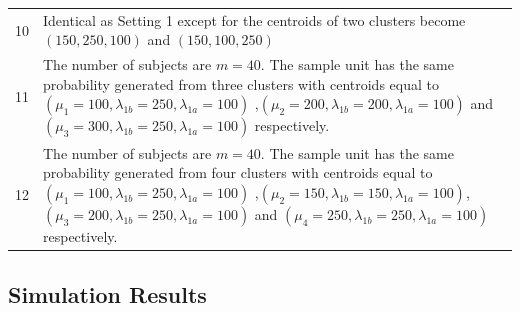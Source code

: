 \documentclass[12pt]{article}
\begin{document}
\begin{table}[htp]
\begin{tabular}{cl}
10& \multicolumn{1}{p{14.5cm}}{Identical as Setting 1  except for the centroids of two clusters become $(150,250,100)$ and $(150,100,250)$}\\
   
11& \multicolumn{1}{p{14.5cm}}{The number of subjects are $m=40$. The sample unit has the same probability generated from three clusters with centroids equal to $(\mu_1=100,\lambda_{1b}=250,\lambda_{1a}=100)$ ,$(\mu_2=200,\lambda_{1b}=200,\lambda_{1a}=100)$ and $(\mu_3=300,\lambda_{1b}=250,\lambda_{1a}=100)$ respectively.}\\

12& \multicolumn{1}{p{14.5cm}}{The number of subjects are $m=40$. The sample unit has the same probability generated from four clusters with centroids equal to $(\mu_1=100,\lambda_{1b}=250,\lambda_{1a}=100)$ ,$(\mu_2=150,\lambda_{1b}=150,\lambda_{1a}=100)$, $(\mu_3=200,\lambda_{1b}=250,\lambda_{1a}=100)$ and $(\mu_4=250,\lambda_{1b}=250,\lambda_{1a}=100)$ respectively.}\\\hline
  

    \end{tabular}%
\end{table}%
\subsection{Simulation Results}
\end{document}
